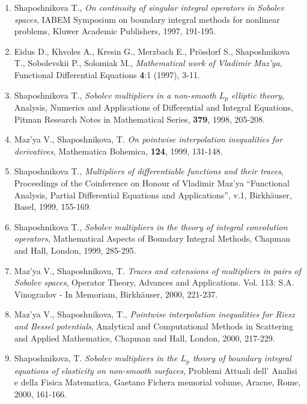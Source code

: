 \documentclass{article}
\begin{document}
\begin{enumerate}
\item Shaposhnikova T., {\it On continuity of singular integral
operators in Sobolev spaces}, IABEM Symposium on boundary integral
methods for nonlinear problems, Kluwer Academic Publishers, 1997,
191-195.

\item Eidus D., Khvoles A., Kresin G., Merzbach E., Pr\"osdorf S.,
Shaposhnikova T., Sobolevskii P., Solomiak M., {\it
Mathematical work of Vladimir Maz'ya}, Functional Differential
Equations {\bf 4}:1 (1997), 3-11.

\item  Shaposhnikova T., {\it Sobolev multipliers in a non-smooth
$L_p$ elliptic theory}, Analysis,
Numerics and Applications of Differential and Integral Equations,
Pitman Research Notes in Mathematical Series, {\bf 379}, 1998,
205-208.


\item Maz'ya V., Shaposhnikova, T. {\it On pointwise interpolation
inequalities for derivatives}, Mathematica Bohemica, {\bf
124}, 1999, 131-148.

\item Shaposhnikova T., {\it Multipliers of differentiable functions
and
their traces}, Proceedings of the Coinference on Honour of
Vladimir Maz'ya ``Functional Analysis, Partial Differential Equations
and
Applications'', v.1, Birkh\"auser, Basel, 1999, 155-169.

\item Shaposhnikova T., {\it Sobolev multipliers in the theory of
integral
convolution operators}, Mathematical Aspects of Boundary
Integral Methods, Chapman and Hall, London, 1999, 285-295.

\item Maz'ya V., Shaposhnikova, T. {\it Traces and extensions of
multipliers in pairs of Sobolev spaces},
Operator Theory, Advances and Applications. Vol. 113: S.A. Vinogradov
- In
Memoriam, Birkh\"auser, 2000, 221-237.

\item Maz'ya V., Shaposhnikova, T., {\it Pointwise interpolation
inequalities for Riesz and Bessel potentials}, Analytical and
Computational Methods in Scattering and Applied Mathematics, Chapman
and
Hall, London, 2000, 217-229.

\item Shaposhnikova, T. {\it Sobolev multipliers in the $L_p$ theory
of
boundary integral equations of elasticity
    on  non-smooth surfaces}, Problemi Attuali dell' Analisi e della
Fisica Matematica,
    Gaetano Fichera memorial volume, Aracne, Rome, 2000, 161-166.


\end{enumerate}
\end{document}
